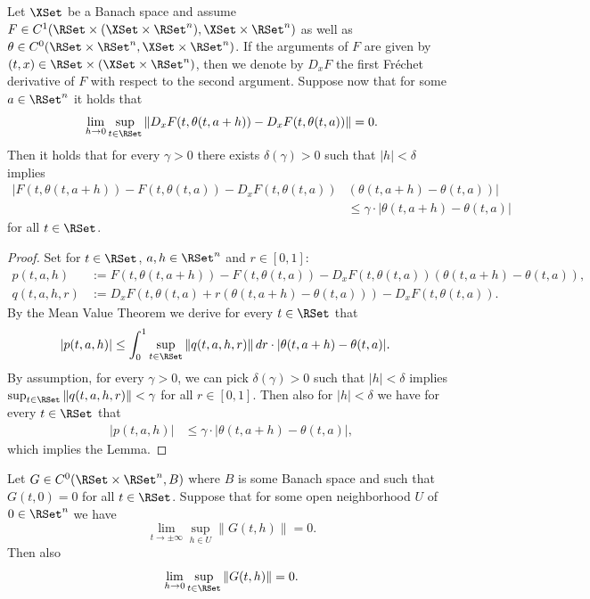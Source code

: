 \documentclass[a4paper]{siamart190516}
\begin{document}
 \begin{lemma}\label{lem:uniformdiff}
 Let $\XSet$ be a Banach space and assume $F \in C^1(\RSet \times (\XSet \times \RSet^{n}), \XSet \times \RSet^n)$ as well as 
 $\theta \in C^0(\RSet \times \RSet^n,\XSet \times \RSet^{n})$. If the arguments of $F$ are given by $(t,x) \in \RSet \times (\XSet \times \RSet^{n})$,
 then we denote by $D_x F$ the first Fr\'echet derivative of $F$ with respect to the second argument. 
 Suppose now that for some $a \in \RSet^n$ it holds that 
  \[
  \lim_{h \rightarrow 0} \sup_{t \in \RSet} \| D_x F(t,\theta(t,a+h)) - D_x F(t,\theta(t,a)) \| = 0.
  \]
  Then it holds that for every $\gamma > 0$ there exists $\delta(\gamma)>0$ such that $|h| < \delta$ implies
  \begin{align*}
  |F(t,\theta(t,a+h)) - F(t,\theta(t,a)) - D_xF(t,\theta(t,a)) &(\theta(t,a+h)-\theta(t,a))| \\
   &\leq \gamma \cdot |\theta(t,a+h)-\theta(t,a)|
  \end{align*}
  for all $t \in \RSet$.
 \end{lemma}
 
  \begin{proof}
  Set for $t \in \RSet$, $a,h \in \RSet^n$ and $r \in [0,1]$:
  \begin{align*}
  p(t,a,h) &:= F(t,\theta(t,a+h)) - F(t,\theta(t,a)) - D_x F(t,\theta(t,a)) (\theta(t,a+h)-\theta(t,a)), \\
  q(t,a,h,r) &:= D_x F(t,\theta(t,a) + r (\theta(t,a+h)-\theta(t,a))) - D_x F(t,\theta(t,a)).
  \end{align*}
  By the Mean Value Theorem we derive for every $t \in \RSet$ that
  \begin{align*}
  |p(t,a,h)| &\leq \int_0^1\sup_{t \in \RSet}  \|q(t,a,h,r) \| \, dr \cdot |\theta(t,a+h)-\theta(t,a)|.
  \end{align*}
  By assumption, for every $\gamma > 0$, we can pick $\delta(\gamma) > 0$ such that $|h| < \delta$ implies $\sup_{t \in \RSet} \|q(t,a,h,r) \| < \gamma$ for all $r \in [0,1]$. Then also for $|h| < \delta$ we have for every $t \in \RSet$ that
    \begin{align*}
  |p(t,a,h)| &\leq \gamma \cdot |\theta(t,a+h)-\theta(t,a)|,
  \end{align*}
  which implies the Lemma.
  \end{proof}
  
  \begin{lemma}
  Let $G \in C^0(\RSet \times \RSet^n, B)$ where $B$ is some Banach space and such that $G(t,0)=0$ for all $t \in \RSet$. Suppose that for some open neighborhood $U$ of $0 \in \RSet^n$ we have
   \[
  \lim_{t \rightarrow \pm \infty} \sup_{h \in U} \| G(t,h) \| = 0.
  \]
  Then also
   \[
  \lim_{h \rightarrow 0} \sup_{t \in \RSet} \| G(t,h) \| = 0.
  \]
  \end{lemma}
  
\end{document}
